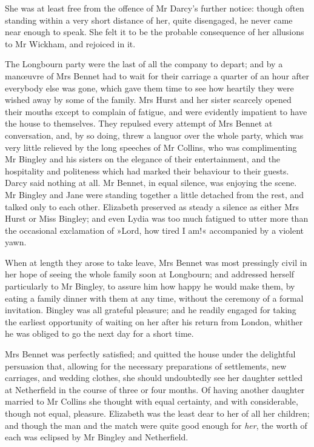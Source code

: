 She was at least free from the offence of Mr Darcy's further notice: though often standing within a very short distance of her, quite disengaged, he never came near enough to speak. She felt it to be the probable consequence of her allusions to Mr Wickham, and rejoiced in it.

The Longbourn party were the last of all the company to depart; and by a manœuvre of Mrs Bennet had to wait for their carriage a quarter of an hour after everybody else was gone, which gave them time to see how heartily they were wished away by some of the family. Mrs Hurst and her sister scarcely opened their mouths except to complain of fatigue, and were evidently impatient to have the house to themselves. They repulsed every attempt of Mrs Bennet at conversation, and, by so doing, threw a languor over the whole party, which was very little relieved by the long speeches of Mr Collins, who was complimenting Mr Bingley and his sisters on the elegance of their entertainment, and the hospitality and politeness which had marked their behaviour to their guests. Darcy said nothing at all. Mr Bennet, in equal silence, was enjoying the scene. Mr Bingley and Jane were standing together a little detached from the rest, and talked only to each other. Elizabeth preserved as steady a silence as either Mrs Hurst or Miss Bingley; and even Lydia was too much fatigued to utter more than the occasional exclamation of »Lord, how tired I am!« accompanied by a violent yawn.

When at length they arose to take leave, Mrs Bennet was most pressingly civil in her hope of seeing the whole family soon at Longbourn; and addressed herself particularly to Mr Bingley, to assure him how happy he would make them, by eating a family dinner with them at any time, without the ceremony of a formal invitation. Bingley was all grateful pleasure; and he readily engaged for taking the earliest opportunity of waiting on her after his return from London, whither he was obliged to go the next day for a short time.

Mrs Bennet was perfectly satisfied; and quitted the house under the delightful persuasion that, allowing for the necessary preparations of settlements, new carriages, and wedding clothes, she should undoubtedly see her daughter settled at Netherfield in the course of three or four months. Of having another daughter married to Mr Collins she thought with equal certainty, and with considerable, though not equal, pleasure. Elizabeth was the least dear to her of all her children; and though the man and the match were quite good enough for \textit{her}, the worth of each was eclipsed by Mr Bingley and Netherfield.